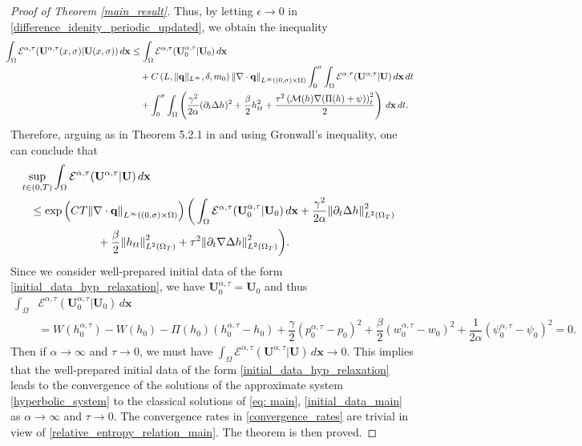 \documentclass[11pt]{article}
\numberwithin{equation}{section}
\newtheorem{counter example}[theorem]{Counter Example}
\numberwithin{equation}{section}
\numberwithin{equation}{section}
\newcommand{\rel}{^{\alpha, \tau}}
\begin{document}
\begin{proof}[Proof of Theorem \ref{main_result}]
Thus, by letting $\epsilon \rightarrow 0$ in \eqref{difference_idenity_periodic_updated}, we obtain the inequality
\begin{align*}
   \hspace{-0.2 cm} \int_{\Omega} \mathcal{E}^{\alpha, \tau}(\mathbf{U}\rel
    (x, \sigma)| {\mathbf U}(x, \sigma))\, d\mathbf{x}&\leq\int_{\Omega} \mathcal{E}^{\alpha, \tau}(\mathbf{U}_0\rel| {\mathbf U}_0)\, d\mathbf{x}\\
   & \quad+ C\left(L,\lVert \mathbf{q}\rVert_{L^{\infty}}, \delta, m_0\right) {\lVert \nabla\cdot \mathbf{q}\rVert}_{L^{\infty}((0, \sigma)\times \Omega)}\int_{0}^{\sigma}\int_{\Omega}\mathcal{E}^{\alpha, \tau}(\mathbf{U\rel}|\mathbf{{U})}\, d\mathbf{x}\,dt\\
&\quad+\int_{0}^{\sigma}\int_{\Omega}\left(\dfrac{\gamma^2}{2\alpha}(\partial_t\Delta{h})^2+\dfrac{\beta}{2} {h}_{tt}^2+ \dfrac{\tau^2 \left(\mathcal{M}({h})\nabla(\Pi({h})+{\psi})\right)_t^2}{2}\right)\,d\mathbf{x}\,dt.
\end{align*}
Therefore, arguing as in Theorem 5.2.1 in \cite{dafermos2005hyperbolic} and using Gronwall's inequality, one can conclude that
\begin{equation}
\begin{aligned}
 &\hspace{-0.3 cm}\sup_{t\in (0, T)}  \int_{\Omega}\mathcal{E}^{\alpha, \tau}(\mathbf{U}\rel|\mathbf{{U}})\, d\mathbf{x}\\
 &\leq \exp\left(CT{\lVert \nabla\cdot \mathbf{q}\rVert}_{L^{\infty}((0, \sigma)\times \Omega)}\right)\bigg(\int_{\Omega} \mathcal{E}^{\alpha, \tau}(\mathbf{U}_0\rel|\mathbf{{U}}_0)\, d\mathbf{x}+\dfrac{\gamma^2}{2\alpha} {\lVert {\partial_t \Delta h}\rVert}_{{{L}^{2}}(\Omega_T)}^2\\
 &\qquad\qquad \qquad+\dfrac{\beta}{2} {\lVert{h}_{tt}\rVert}_{{{L}^{2}}(\Omega_T)}^2
 + \tau^2{\lVert {\partial_t \nabla \Delta h}\rVert}_{{{L}^{2}}(\Omega_T)}^2 \bigg).
\end{aligned}
\end{equation}
Since we consider well-prepared initial data of the form \eqref{initial_data_hyp_relaxation}, we have $\mathbf{U}\rel_0=\mathbf{{U}}_0$ and thus
\begin{align*}
\int_{\Omega}&\mathcal{E}^{\alpha, \tau}(\mathbf{U}_0\rel|\mathbf{{U}}_0)\,d\mathbf{x}\\
&=W(h_0\rel)-W({h}_0)-\Pi({h}_0)(h_0\rel-{h}_0)+\dfrac{\gamma}{2}(p\rel_0-{p}_0)^2+\dfrac{ \beta}{2}  (w\rel_0-{w}_0)^2+\dfrac{1}{2\alpha}(\psi\rel_0-{\psi}_0)^2=0.
\end{align*}
Then if $\alpha\rightarrow \infty$ and $\tau\rightarrow 0$, we must have $\int_{\Omega}\mathcal{E}^{\alpha, \tau}(\mathbf{U}\rel|\mathbf{{U}})\, d\mathbf{x}\rightarrow 0$. This implies that the well-prepared initial data of the form \eqref{initial_data_hyp_relaxation} leads to the convergence of the solutions of the approximate system \eqref{hyperbolic_system} to the classical solutions of \eqref{eq: main}, \eqref{initial_data_main} as $\alpha\rightarrow \infty$ and $\tau\rightarrow 0$. The convergence rates in \eqref{convergence_rates} are trivial in view of \eqref{relative_entropy_relation_main}.
The theorem is then proved.
\end{proof}
\end{document}

